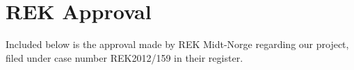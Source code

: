\chapter{REK Approval}
\label{app:consentform}

Included below is the approval made by REK Midt-Norge regarding our project, filed under case number REK2012/159 in their register.


\begin{centering}



\end{centering}